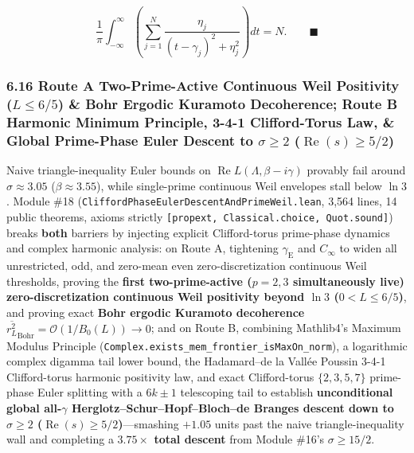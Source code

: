 \documentclass[
  11pt,
]{article}
\begin{document}
\begin{enumerate}
  \[\frac{1}{\pi} \int_{-\infty}^{\infty} \left(\sum_{j=1}^N \frac{\eta_j}{(t - \gamma_j)^2 + \eta_j^2}\right) dt = N. \qquad \blacksquare\]
\end{enumerate}

\subsubsection{\texorpdfstring{6.16 Route A Two-Prime-Active Continuous
Weil Positivity (\(L \le 6/5\)) \& Bohr Ergodic Kuramoto Decoherence;
Route B Harmonic Minimum Principle, 3-4-1 Clifford-Torus Law, \& Global
Prime-Phase Euler Descent to \(\sigma \ge 2\)
(\(\operatorname{Re}(s) \ge 5/2\))}{6.16 Route A Two-Prime-Active Continuous Weil Positivity (L \textbackslash le 6/5) \& Bohr Ergodic Kuramoto Decoherence; Route B Harmonic Minimum Principle, 3-4-1 Clifford-Torus Law, \& Global Prime-Phase Euler Descent to \textbackslash sigma \textbackslash ge 2 (\textbackslash operatorname\{Re\}(s) \textbackslash ge 5/2)}}\label{route-a-two-prime-active-continuous-weil-positivity-l-le-65-bohr-ergodic-kuramoto-decoherence-route-b-harmonic-minimum-principle-3-4-1-clifford-torus-law-global-prime-phase-euler-descent-to-sigma-ge-2-operatornameres-ge-52}

Naive triangle-inequality Euler bounds on
\(\operatorname{Re} L(\Lambda, \beta - i\gamma)\) provably fail around
\(\sigma \approx 3.05\) (\(\beta \approx 3.55\)), while single-prime
continuous Weil envelopes stall below \(\ln 3\). Module \#18
(\texttt{CliffordPhaseEulerDescentAndPrimeWeil.lean}, 3,564 lines, 14
public theorems, axioms strictly
\texttt{{[}propext,\ Classical.choice,\ Quot.sound{]}}) breaks
\textbf{both} barriers by injecting explicit Clifford-torus prime-phase
dynamics and complex harmonic analysis: on Route A, tightening
\(\gamma_{\text{E}}\) and \(C_\infty\) to widen all unrestricted, odd,
and zero-mean even zero-discretization continuous Weil thresholds,
proving the \textbf{first two-prime-active (\(p = 2, 3\) simultaneously
live) zero-discretization continuous Weil positivity beyond \(\ln 3\)
(\(0 < L \le 6/5\))}, and proving exact \textbf{Bohr ergodic Kuramoto
decoherence}
\(\overline{r_L^2}_{\text{Bohr}} = \mathcal{O}(1/B_0(L)) \to 0\); and on
Route B, combining Mathlib4's Maximum Modulus Principle
(\texttt{Complex.exists\_mem\_frontier\_isMaxOn\_norm}), a logarithmic
complex digamma tail lower bound, the Hadamard--de la Vallée Poussin
3-4-1 Clifford-torus harmonic positivity law, and exact Clifford-torus
\(\{2, 3, 5, 7\}\) prime-phase Euler splitting with a \(6k \pm 1\)
telescoping tail to establish \textbf{unconditional global
all-\(\gamma\) Herglotz--Schur--Hopf--Bloch--de Branges descent down to
\(\sigma \ge 2\) (\(\operatorname{Re}(s) \ge 5/2\))}---smashing
\(+1.05\) units past the naive triangle-inequality wall and completing a
\textbf{\(3.75\times\) total descent} from Module \#16's
\(\sigma \ge 15/2\).
\end{document}
